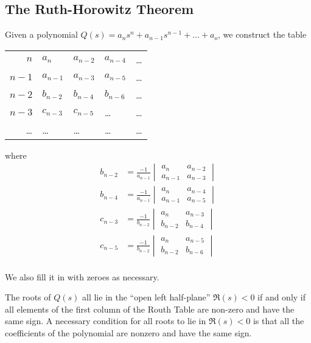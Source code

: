 \documentclass[12pt]{article}
\begin{document}
\subsection{The Ruth-Horowitz Theorem}
Given a polynomial $Q(s) = a_ns^n + a_{n-1}s^{n-1} + \dots + a_o$, we construct the table
\begin{table}[ht]
\centering
  \begin{tabular}{r|llll}
  $n$     & $a_n$     & $a_{n-2}$ & $a_{n-4}$ & \dots \\
  $n - 1$ & $a_{n-1}$ & $a_{n-3}$ & $a_{n-5}$ & \dots \\
  $n - 2$ & $b_{n-2}$ & $b_{n-4}$ & $b_{n-6}$ & \dots \\
  $n - 3$ & $c_{n-3}$ & $c_{n-5}$ & \dots     & \dots \\
  \dots   & \dots     & \dots     & \dots     & \dots \\
  \end{tabular}
\end{table}
where
\begin{align*}
b_{n-2} &= \frac{-1}{a_{n-1}} \begin{vmatrix} a_n & a_{n-2} \\ a_{n-1} & a_{n-3} \end{vmatrix} \\
b_{n-4} &= \frac{-1}{a_{n-1}} \begin{vmatrix} a_n & a_{n-4} \\ a_{n-1} & a_{n-5} \end{vmatrix} \\
c_{n-3} &= \frac{-1}{b_{n-2}} \begin{vmatrix} a_n & a_{n-3} \\ b_{n-2} & b_{n-4} \end{vmatrix} \\
c_{n-5} &= \frac{-1}{b_{n-2}} \begin{vmatrix} a_n & a_{n-5} \\ b_{n-2} & b_{n-6} \end{vmatrix} \\
\end{align*}

We also fill it in with zeroes as necessary.

The roots of $Q(s)$ all lie in the ``open left half-plane'' $\Re(s) < 0$ if and only if all elements of the first column of the Routh Table are non-zero and have the same sign. A necessary condition for all roots to lie in $\Re(s) < 0$ is that all the coefficients of the polynomial are nonzero and have the same sign.
\end{document}
